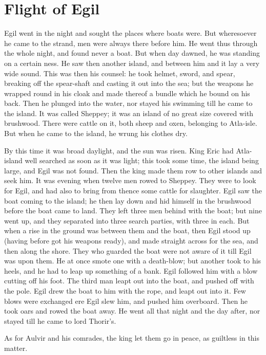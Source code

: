 \chapter{Flight of Egil}

Egil went in the night and sought the places where boats were. But wheresoever he came to the strand, men were always there before him. He went thus through the whole night, and found never a boat. But when day dawned, he was standing on a certain ness. He saw then another island, and between him and it lay a very wide sound. This was then his counsel: he took helmet, sword, and spear, breaking off the spear-shaft and casting it out into the sea; but the weapons he wrapped round in his cloak and made thereof a bundle which he bound on his back. Then he plunged into the water, nor stayed his swimming till he came to the island. It was called Sheppey; it was an island of no great size covered with brushwood. There were cattle on it, both sheep and oxen, belonging to Atla-isle. But when he came to the island, he wrung his clothes dry.

By this time it was broad daylight, and the sun was risen. King Eric had Atla-island well searched as soon as it was light; this took some time, the island being large, and Egil was not found. Then the king made them row to other islands and seek him. It was evening when twelve men rowed to Sheppey. They were to look for Egil, and had also to bring from thence some cattle for slaughter. Egil saw the boat coming to the island; he then lay down and hid himself in the brushwood before the boat came to land. They left three men behind with the boat; but nine went up, and they separated into three search parties, with three in each. But when a rise in the ground was between them and the boat, then Egil stood up (having before got his weapons ready), and made straight across for the sea, and then along the shore. They who guarded the boat were not aware of it till Egil was upon them. He at once smote one with a death-blow; but another took to his heels, and he had to leap up something of a bank. Egil followed him with a blow cutting off his foot. The third man leapt out into the boat, and pushed off with the pole. Egil drew the boat to him with the rope, and leapt out into it. Few blows were exchanged ere Egil slew him, and pushed him overboard. Then he took oars and rowed the boat away. He went all that night and the day after, nor stayed till he came to lord Thorir's.

As for Aulvir and his comrades, the king let them go in peace, as guiltless in this matter.

